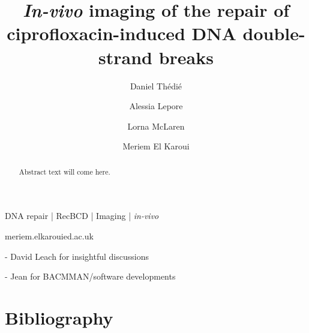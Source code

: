 \documentclass[times, twoside]{zHenriquesLab-StyleBioRxiv}
\begin{document}
\title{\emph{In-vivo} imaging of the repair of ciprofloxacin-induced DNA double-strand breaks}
\shorttitle{}

\author[1]{Daniel Thédié}
\author[2]{Alessia Lepore}
\author[1]{Lorna McLaren}
\author[1]{Meriem El Karoui}



\maketitle

\begin{abstract}
Abstract text will come here.
\end{abstract}

\begin{keywords}
DNA repair | RecBCD | Imaging | \emph{in-vivo}
\end{keywords}

\begin{corrauthor}
meriem.elkaroui\at ed.ac.uk
\end{corrauthor}













\begin{acknowledgements}
- David Leach for insightful discussions

- Jean for BACMMAN/software developments
\end{acknowledgements}

\section*{Bibliography}


\onecolumn
\newpage


\end{document}
